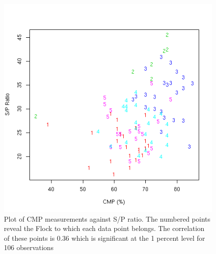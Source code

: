 %

\begin{figure}[!h]
  \centering
  \includegraphics[width=1.0\textwidth]{spcmp.png}
  \caption{Plot of CMP measurements against S/P ratio. The numbered points reveal the Flock to which each data point belongs. The correlation of these points is 0.36 which is significant at the 1 percent level for 106 observations}
  \label{fig:spcmp}
\end{figure}

%

